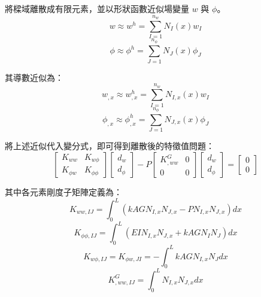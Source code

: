 \documentclass[UTF8, a4paper, 12pt]{ctexart}
\begin{document}
將樑域離散成有限元素，並以形狀函數近似場變量 $w$ 與 $\phi$。
\begin{equation}
  w \approx w^{h} = \sum_{I=1}^{n_{w}}N_{I}(x)w_{I}
\end{equation}
\begin{equation}
  \phi \approx \phi^{h} = \sum_{J=1}^{n_{\phi}}N_{J}(x)\phi_{J}
\end{equation}

其導數近似為：
\begin{equation}
  w_{,x} \approx w_{,x}^{h} = \sum_{I=1}^{n_{w}}N_{I,x}(x)w_{I}
\end{equation}
\begin{equation}
  \phi_{,x} \approx \phi_{,x}^{h} = \sum_{J=1}^{n_{\phi}}N_{J,x}(x)\phi_{J}
\end{equation}


將上述近似代入變分式，即可得到離散後的特徵值問題：
\begin{equation}
  \begin{bmatrix}
    K_{ww} & K_{w\phi} \\
    K_{\phi w} & K_{\phi\phi}
  \end{bmatrix}
  \begin{bmatrix}
    d_{w} \\
    d_{\phi}
  \end{bmatrix}
  - P
  \begin{bmatrix}
    K_{,ww}^{G} & 0 \\
    0 & 0
  \end{bmatrix}
  \begin{bmatrix}
    d_{w} \\
    d_{\phi}
  \end{bmatrix} = \begin{bmatrix} 0 \\ 0 \end{bmatrix}
\end{equation}

其中各元素剛度子矩陣定義為：
\begin{equation}
  K_{ww,IJ} = \int_{0}^{L}(kAGN_{I,x}N_{J,x} - PN_{I,x}N_{J,x})dx
\end{equation}
\begin{equation}
  K_{\phi\phi,IJ} = \int_{0}^{L}(EIN_{I,x}N_{J,x} + kAGN_{I}N_{J})dx
\end{equation}
\begin{equation}
  K_{w\phi,IJ} = K_{\phi w,JI} = -\int_{0}^{L}kAGN_{I,x}N_{J}dx
\end{equation}
\begin{equation}
  K_{,ww,IJ}^{G} = \int_{0}^{L}N_{I,x}N_{J,x}dx
\end{equation}
\end{document}
